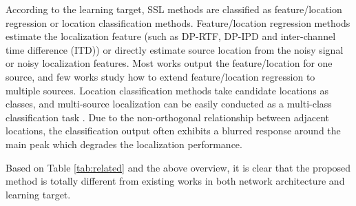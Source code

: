 \documentclass[lettersize,journal]{IEEEtran}
\begin{document}
According to the learning target, SSL methods are classified as  feature/location regression or location classification methods. Feature/location regression methods estimate the localization feature (such as DP-RTF, DP-IPD and inter-channel time difference (ITD)) \cite{TDOA_LSTM_ICASSP19, yang2021learning ,Yang2022SRPDNNLD, WYBIS23, Yang2021EnhancingDR, Tang2019SupervisedCE,Pak2019SoundLB} or directly estimate source location \cite{He2021NeuralNA,DiazGuerra2020RobustSS,DiazGuerra2022DirectionOA,Fu2022IterativeSS,Cho2023SRSRPSB} from the noisy signal or noisy localization features. Most works output the feature/location for one source, and few works study how to extend feature/location regression to multiple sources. Location classification methods \cite{Grumiaux2021SaladnetSM,Wang2023FramewiseMS,Kowalk2022GeometryAwareDE,Yin2022MIMODoAnetMI,Adavanne2017DirectionOA,Nguyen2020RobustSC,Adavanne2018SoundEL} take candidate locations as classes, and multi-source localization can be easily conducted as a multi-class classification task \cite{Grumiaux2021SaladnetSM,Adavanne2017DirectionOA,Nguyen2020RobustSC,Adavanne2018SoundEL}. 
Due to the non-orthogonal relationship between adjacent locations, the classification output often exhibits a blurred response around the main peak which degrades the localization performance.

Based on Table \ref{tab:related} and the above overview, it is clear that the proposed method is totally different from existing works in both network architecture and learning target. 
\end{document}
